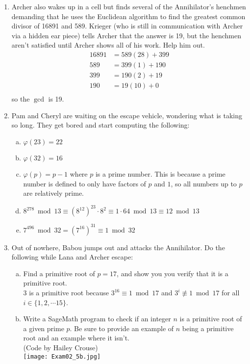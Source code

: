 \documentclass[12pt]{amsart}
\theoremstyle{plain}
\theoremstyle{definition}
\begin{document}
\begin{enumerate}[1.]
\begin{enumerate}[a.]
		\end{enumerate}
	\item Archer also wakes up in a cell but finds several of the Annihilator's henchmen demanding that he uses the Euclidean algorithm to find the greatest common divisor of 16891 and 589.  Krieger (who is still in communication with Archer via a hidden ear piece) tells Archer that the answer is 19, but the henchmen aren't satisfied until Archer shows all of his work.  Help him out.\\
	
	\begin{align*}
	16891 &= 589(28) + 399\\
	589 &= 399(1) + 190\\
	399 &= 190(2) + 19\\
	190 &= 19(10) + 0\\
	\end{align*}
	so the $\gcd$ is 19.\\
	
	\item Pam and Cheryl are waiting on the escape vehicle, wondering what is taking so long.  They get bored and start computing the following:
		\begin{enumerate}[a.]
			\item $\varphi(23) = 22$\\
			\item $\varphi(32) = 16$\\
			\item $\varphi(p) = p-1$ where $p$ is a prime number.  This is because a prime number is defined to only have factors of $p$ and $1$, so all numbers up to $p$ are relatively prime.\\
			\item $8^{278} \bmod 13 \equiv (8^{12})^{23} \cdot 8^2 \equiv 1 \cdot 64 \bmod 13 \equiv 12 \bmod 13$ \\
			\item $7^{496} \bmod 32 = (7^{16})^{31} \equiv 1 \bmod 32$ \\
		\end{enumerate}
	\item Out of nowhere, Babou jumps out and attacks the Annihilator.  Do the following while Lana and Archer escape:\\
		\begin{enumerate}[a.]
			\item Find a primitive root of $p = 17$, and show you you verify that it is a primitive root.\\
			3 is a primitive root because $3^{16} \equiv 1 \bmod 17$ and $3^{i} \not\equiv 1 \bmod 17$ for all $i \in \{1,2, \cdots 15\}$.\\
			\item Write a SageMath program to check if an integer $n$ is a primitive root of a given prime $p$.  Be sure to provide an example of $n$ being a primitive root and an example where it isn't.\\
			(Code by Hailey Crouse)\\
			\texttt{[image: Exam02\_5b.jpg]}
			

\end{enumerate}
\end{enumerate}
\end{document}
